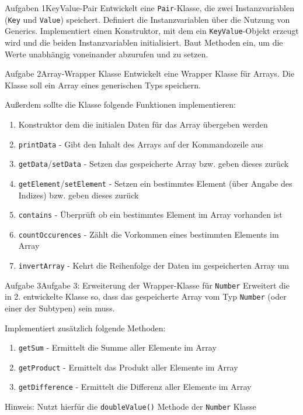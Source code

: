 \begin{frame}{Aufgaben 1}{KeyValue-Pair}
    Entwickelt eine \texttt{Pair}-Klasse, die zwei Instanzvariablen (\texttt{Key} und \texttt{Value}) speichert. Definiert die Instanzvariablen über die Nutzung von Generics.
    Implementiert einen Konstruktor, mit dem ein \texttt{KeyValue}-Objekt erzeugt wird und die beiden Instanzvariablen initialisiert. Baut Methoden ein, um die Werte unabhängig voneinander abzurufen und zu setzen.
\end{frame}
    
\begin{frame}[allowframebreaks]{Aufgabe 2}{Array-Wrapper Klasse}    
    Entwickelt eine Wrapper Klasse für Arrays. Die Klasse soll ein Array eines generischen Typs speichern.
    
    Außerdem sollte die Klasse folgende Funktionen implementieren:
    \begin{enumerate}
        \item Konstruktor dem die initialen Daten für das Array übergeben werden
        \item \texttt{printData} - Gibt den Inhalt des Arrays auf der Kommandozeile aus
        \item \texttt{getData}/\texttt{setData} - Setzen das gespeicherte Array bzw. geben dieses zurück
        \item \texttt{getElement}/\texttt{setElement} - Setzen ein bestimmtes Element (über Angabe des Indizes) bzw. geben dieses zurück
        \item \texttt{contains} - Überprüft ob ein bestimmtes Element im Array vorhanden ist
        \item \texttt{countOccurences} - Zählt die Vorkommen eines bestimmten Elements im Array
        \item \texttt{invertArray} - Kehrt die Reihenfolge der Daten im gespeicherten Array um
    \end{enumerate}
\end{frame}

\begin{frame}{Aufgabe 3}{Aufgabe 3: Erweiterung der Wrapper-Klasse für \texttt{Number}}    
    Erweitert die in 2. entwickelte Klasse so, dass das gespeicherte Array vom Typ \texttt{Number} (oder einer der Subtypen) sein muss.
    
    Implementiert zusätzlich folgende Methoden:
    \begin{enumerate}
        \item \texttt{getSum} - Ermittelt die Summe aller Elemente im Array
        \item \texttt{getProduct} - Ermittelt das Produkt aller Elemente im Array
        \item \texttt{getDifference} - Ermittelt die Differenz aller Elemente im Array
    \end{enumerate}
    
    Hinweis: Nutzt hierfür die \texttt{doubleValue()} Methode der \texttt{Number} Klasse
\end{frame}
    

